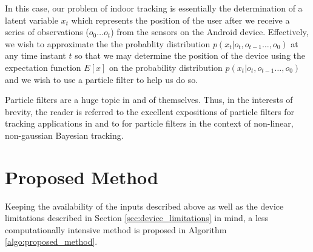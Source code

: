\documentclass[10pt,journal,letterpaper,compsoc]{IEEEtran}
\begin{document}
In this case, our problem of indoor tracking is essentially the 
determination of a latent variable $x_t$ which represents the position of the 
user after we receive a series of observations ($o_0 \dots o_t$) from the 
sensors on the Android device. Effectively, we wish to approximate the the 
probablity distribution $p(x_t|o_t,o_{t-1}\dots,o_0)$ at any time instant $t$
so that we may determine the position of the device using the expectation 
function $E[x]$ on the probability distribution $p(x_t|o_t,o_{t-1}\dots,o_0)$
and we wish to use a particle filter to help us do so.

Particle filters are a huge topic in and of themselves. Thus, in the interests
of brevity, the reader is referred to the excellent expositions of particle 
filters for tracking applications in \cite{Ristic} and to \cite{Arulampalam}
for particle filters in the context of non-linear, non-gaussian Bayesian
tracking.


\section{Proposed Method}

Keeping the availability of the inputs described above as well as the device 
limitations described in Section \ref{sec:device_limitations} in mind, a less 
computationally intensive method is proposed in 
Algorithm \ref{algo:proposed_method}.

\end{document}
